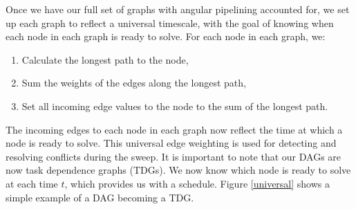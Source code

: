 Once we have our full set of graphs with angular pipelining accounted for, we set up each graph to reflect a universal timescale, with the goal of knowing when each node in each graph is ready to solve.
For each node in each graph, we:
\begin{enumerate}
  \item Calculate the longest path to the node,
  \item Sum the weights of the edges along the longest path,
  \item Set all incoming edge values to the node to the sum of the longest path.
\end{enumerate}
The incoming edges to each node in each graph now reflect the time at which a node is ready to solve. This universal edge weighting is used for detecting and resolving conflicts during the sweep. It is important to note that our DAGs are now task dependence graphs (TDGs). We now know which node is ready to solve at each time $t$, which provides us with a schedule. Figure \ref{universal} shows a simple example of a DAG becoming a TDG.
